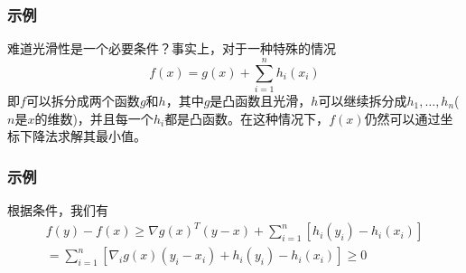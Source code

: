 \documentclass[10pt]{beamer}
\begin{document}
\begin{frame}
	\frametitle{示例}

	难道光滑性是一个必要条件？事实上，对于一种特殊的情况
	$$
	f(x)=g(x)+\sum_{i=1}^{n} h_{i}\left(x_{i}\right)
	$$
	即$f$可以拆分成两个函数$g$和$h$，其中$g$是凸函数且光滑，$h$可以继续拆分成$h_{1},\ldots,h_{n}$($n$是$x$的维数)，并且每一个$h_{i}$都是凸函数。在这种情况下，$f(x)$仍然可以通过坐标下降法求解其最小值。
\end{frame}

\begin{frame}
	\frametitle{示例}

	根据条件，我们有
	$$
	\begin{array}{l}
	f(y)-f(x) \geq \nabla g(x)^{T}(y-x)+\sum_{i=1}^{n}\left[h_{i}\left(y_{i}\right)-h_{i}\left(x_{i}\right)\right] \\
	=\sum_{i=1}^{n}\left[\nabla_{i} g(x)\left(y_{i}-x_{i}\right)+h_{i}\left(y_{i}\right)-h_{i}\left(x_{i}\right)\right] \geq 0
	\end{array}
	$$
	
\end{frame}





%



\end{document}
